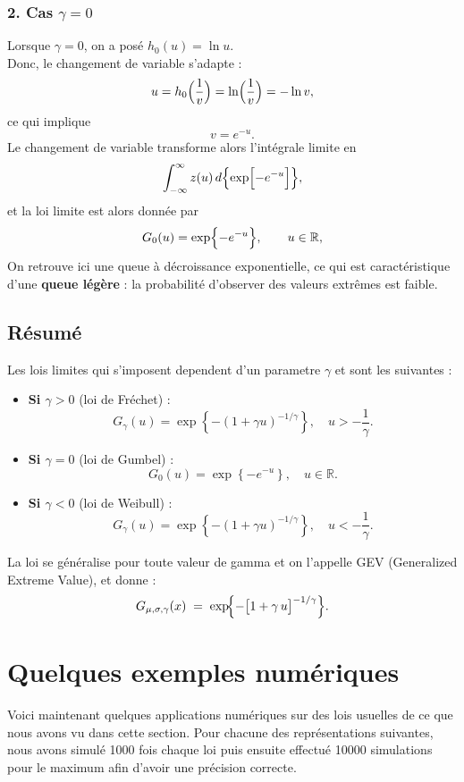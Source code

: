 \documentclass{article}
\begin{document}
\subsubsection{2. Cas \(\gamma=0\)}
Lorsque \(\gamma = 0\), on a posé $h_0(u)=\ln u$.
\\
Donc, le changement de variable s'adapte : 
\[
u=h_0\Bigl(\frac{1}{v}\Bigr)=\ln\Bigl(\frac{1}{v}\Bigr)=-\ln v,
\]
ce qui implique
\[
v=e^{-u}.
\]
Le changement de variable transforme alors l'intégrale limite en
\[
\int_{-\infty}^{\infty} z(u)\,d\Bigl\{\exp\Bigl[-e^{-u}\Bigr]\Bigr\},
\]
et la loi limite est alors donnée par
\[
G_0(u)=\exp\Bigl\{-e^{-u}\Bigr\},\qquad u\in\mathbb{R},
\]
On retrouve ici une queue à décroissance exponentielle, ce qui est caractéristique d'une \textbf{queue légère} : la probabilité d'observer des valeurs extrêmes est faible.
\\
\subsection{Résumé}
Les lois limites qui s'imposent dependent d'un parametre $\gamma$ et sont les suivantes :
\\
\begin{itemize}
    \item \textbf{Si \(\gamma>0\)} (loi de Fréchet) :
    \[
    G_\gamma(u)=\exp\left\{-\left(1+\gamma u\right)^{-1/\gamma}\right\}, \quad u > -\frac{1}{\gamma}.
    \]
    
    \item \textbf{Si \(\gamma=0\)} (loi de Gumbel) :
    \[
    G_0(u)=\exp\left\{-e^{-u}\right\}, \quad u\in\mathbb{R}.
    \]
    
    \item \textbf{Si \(\gamma<0\)} (loi de Weibull) :
    \[
    G_\gamma(u)=\exp\left\{-\left(1+\gamma u\right)^{-1/\gamma}\right\}, \quad u < -\frac{1}{\gamma}.
    \]
\end{itemize}

La loi se généralise pour toute valeur de gamma et on l'appelle GEV (Generalized Extreme Value), et donne :
\[
	G_{\mu,\sigma,\gamma}(x)
	\;=\;
	\exp\!\Bigl\{-\bigl[1 + \gamma\,u\bigr]^{-1/\gamma}\Bigr\}.
\]


\newpage
\section{Quelques exemples numériques}

\noindent Voici maintenant quelques applications numériques sur des lois usuelles de ce que nous avons vu dans cette section. Pour chacune des représentations suivantes, nous avons simulé 1000 fois chaque loi puis ensuite effectué 10000 simulations pour le maximum afin d'avoir une précision correcte. 
\end{document}
